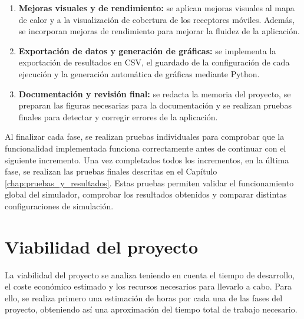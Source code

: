 \begin{enumerate}
    \item \textbf{Mejoras visuales y de rendimiento:} se aplican mejoras visuales al mapa de calor y a la visualización de cobertura de los receptores móviles. Además, se incorporan mejoras de rendimiento para mejorar la fluidez de la aplicación.

    \item \textbf{Exportación de datos y generación de gráficas:} se implementa la exportación de resultados en CSV, el guardado de la configuración de cada ejecución y la generación automática de gráficas mediante Python.

    \item \textbf{Documentación y revisión final:} se redacta la memoria del proyecto, se preparan las figuras necesarias para la documentación y se realizan pruebas finales para detectar y corregir errores de la aplicación.
\end{enumerate}

Al finalizar cada fase, se realizan pruebas individuales para comprobar que la funcionalidad implementada funciona correctamente antes de continuar con el siguiente incremento. Una vez completados todos los incrementos, en la última fase, se realizan las pruebas finales descritas en el Capítulo \ref{chap:pruebas_y_resultados}. Estas pruebas permiten validar el funcionamiento global del simulador, comprobar los resultados obtenidos y comparar distintas configuraciones de simulación.


\section{Viabilidad del proyecto}

La viabilidad del proyecto se analiza teniendo en cuenta el tiempo de desarrollo, el coste económico estimado y los recursos necesarios para llevarlo a cabo. Para ello, se realiza primero una estimación de horas por cada una de las fases del proyecto, obteniendo así una aproximación del tiempo total de trabajo necesario.

